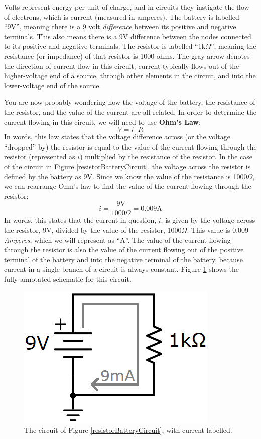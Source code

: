 \par
Volts represent energy per unit of charge, and in circuits they instigate the flow of electrons, which is current (measured in amperes). The battery is labelled ``9V'', meaning there is a 9 volt \textit{difference} between its positive and negative terminals. This also means there is a 9V difference between the nodes connected to its positive and negative terminals. The resistor is labelled ``1k$\Omega$'', meaning the resistance (or impedance) of that resistor is 1000 ohms. The gray arrow denotes the direction of current flow in this circuit; current typically flows out of the higher-voltage end of a source, through other elements in the circuit, and into the lower-voltage end of the source. 
\par
You are now probably wondering how the voltage of the battery, the resistance of the resistor, and the value of the current are all related. In order to determine the current flowing in this circuit, we will need to use \textbf{Ohm's Law}:
$$
V=i \cdot R
$$
In words, this law states that the voltage difference across (or the voltage ``dropped'' by) the resistor is equal to the value of the current flowing through the resistor (represented as $i$) multiplied by the resistance of the resistor. In the case of the circuit in Figure \ref{resistorBatteryCircuit}, the voltage across the resistor is defined by the battery as 9V. Since we know the value of the resistance is 1000$\Omega$, we can rearrange Ohm's law to find the value of the current flowing through the resistor:
$$
i = \frac{9\textrm{V}}{1000\Omega} = 0.009 \textrm{A}
$$
In words, this states that the current in question, $i$, is given by the voltage across the resistor, 9V, divided by the value of the resistor, 1000$\Omega$. This value is 0.009 \textit{Amperes}, which we will represent as ``A''. The value of the current flowing through the resistor is also the value of the current flowing out of the positive terminal of the battery and into the negative terminal of the battery, because current in a single branch of a circuit is always constant. Figure \ref{resistorBatteryCurrentCircuit} shows the fully-annotated schematic for this circuit.
\begin{figure}[h!]
\centering
\includegraphics{figures/batteryResistorCurrentCircuit.png}
\caption{The circuit of Figure \ref{resistorBatteryCircuit}, with current labelled.}
\label{resistorBatteryCurrentCircuit}
\end{figure}
